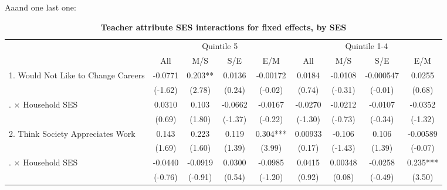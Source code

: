 \documentclass[12pt,preprint, authoryear]{article}
\numberwithin{equation}{section}
\numberwithin{figure}{section}
\numberwithin{table}{section}
\begin{document}
Aaand one last one:

\begin{longtable}[htbp] {p{5cm}*{4}{c}|*{4}{c}} \caption{
\textbf{Teacher attribute SES interactions for fixed effects, by SES}} \label{tab:FE_SES2} \\ \hline\hline
&\multicolumn{4}{c}{Quintile 5}&\multicolumn{4}{c}{Quintile 1-4}\\
                &\multicolumn{1}{c}{All}&\multicolumn{1}{c}{M/S}&\multicolumn{1}{c}{S/E}&\multicolumn{1}{c}{E/M}  &\multicolumn{1}{c}{All}&\multicolumn{1}{c}{M/S}&\multicolumn{1}{c}{S/E}&\multicolumn{1}{c}{E/M}  \\
\hline
1. Would Not Like to Change Careers&  -0.0771         &    0.203** &   0.0136         & -0.00172         &   0.0184         &  -0.0108         &-0.000547         &   0.0255         \\
                &  (-1.62)         &   (2.78)         &   (0.24)         &  (-0.02)         &   (0.74)         &  (-0.31)         &  (-0.01)         &   (0.68)         \\
\quad 1. $\times$ Household SES&   0.0310         &    0.103         &  -0.0662         &  -0.0167         &  -0.0270         &  -0.0212         &  -0.0107         &  -0.0352         \\
                &   (0.69)         &   (1.80)         &  (-1.37)         &  (-0.22)         &  (-1.30)         &  (-0.73)         &  (-0.34)         &  (-1.32)         \\
2. Think Society Appreciates Work&    0.143         &    0.223         &    0.119         &    0.304***&  0.00933         &   -0.106         &    0.106         & -0.00589         \\
                &   (1.69)         &   (1.60)         &   (1.39)         &   (3.99)         &   (0.17)         &  (-1.43)         &   (1.39)         &  (-0.07)         \\
\quad 2. $\times$ Household SES&  -0.0440         &  -0.0919         &   0.0300         &  -0.0985         &   0.0415         &  0.00348         &  -0.0258         &    0.235***\\
                &  (-0.76)         &  (-0.91)         &   (0.54)         &  (-1.20)         &   (0.92)         &   (0.08)         &  (-0.49)         &   (3.50)         \\

\end{longtable}
\end{document}
